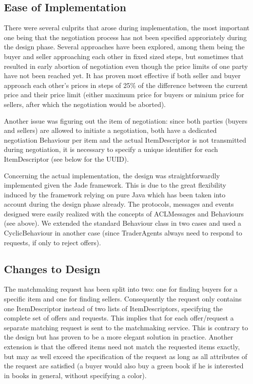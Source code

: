 \documentclass[a4paper,11pt]{article}
\begin{document}
\subsection{Ease of Implementation}
There were several culprits that arose during implementation, the most important one being that the negotiation process has not been specified approriately during the design phase. Several approaches have been explored, among them being the buyer and seller approaching each other in fixed sized steps, but sometimes that resulted in early abortion of negotiation even though the price limits of one party have not been reached yet. It has proven most effective if both seller and buyer approach each other's prices in steps of 25\% of the difference between the current price and their price limit (either maximum price for buyers or minium price for sellers, after which the negotiation would be aborted). 

Another issue was figuring out the item of negotiation: since both parties (buyers and sellers) are allowed to initiate a negotiation, both have a dedicated negotiation Behaviour per item and the actual ItemDescriptor is not transmitted during negotiation, it is necessary to specify a unique identifier for each ItemDescriptor (see below for the UUID).

Concerning the actual implementation, the design was straightforwardly implemented given the Jade framework. This is due to the great flexibility induced by the framework relying on pure Java which has been taken into account during the design phase already. The protocols, messages and events designed were easily realized with the concepts of ACLMessages and Behaviours (see above). We extended the standard Behaviour class in two cases and used a CyclicBehaviour in another case (since TraderAgents always need to respond to requests, if only to reject offers).

\subsection{Changes to Design}
The matchmaking request has been split into two: one for finding buyers for a specific item and one for finding sellers. Consequently the request only contains one ItemDescriptor instead of two lists of ItemDescriptors, specifying the complete set of offers and requests. This implies that for each offer/request a separate matching request is sent to the matchmaking service. This is contrary to the design but has proven to be a more elegant solution in practice. Another extension is that the offered items need not match the requested items exactly, but may as well exceed the specification of the request as long as all attributes of the request are satisfied (a buyer would also buy a green book if he is interested in books in general, without specifying a color).
\end{document}
